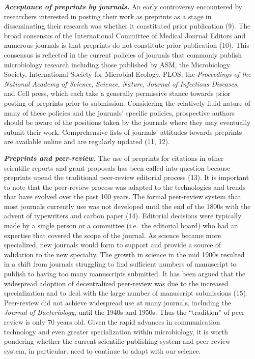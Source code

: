\documentclass[11pt,]{article}
\begin{document}
\textbf{\emph{Acceptance of preprints by journals.}} An early
controversy encountered by researchers interested in posting their work
as preprints as a stage in disseminating their research was whether it
constituted prior publication (9). The broad consensus of the
International Committee of Medical Journal Editors and numerous journals
is that preprints do not constitute prior publication (10). This
consensus is reflected in the current policies of journals that commonly
publish microbiology research including those published by ASM, the
Microbiology Society, International Society for Microbial Ecology, PLOS,
the \emph{Proceedings of the National Academy of Science},
\emph{Science}, \emph{Nature}, \emph{Journal of Infectious Diseases},
and Cell press, which each take a generally permissive stance towards
prior posting of preprints prior to submission. Considering the
relatively fluid nature of many of these policies and the journals'
specific policies, prospective authors should be aware of the positions
taken by the journals where they may eventually submit their work.
Comprehensive lists of journals' attitudes towards preprints are
available online and are regularly updated (11, 12).

\textbf{\emph{Preprints and peer-review.}} The use of preprints for
citations in other scientific reports and grant proposals has been
called into question because preprints upend the traditional peer-review
editorial process (13). It is important to note that the peer-review
process was adapted to the technologies and trends that have evolved
over the past 100 years. The formal peer-review system that most
journals currently use was not developed until the end of the 1800s with
the advent of typewriters and carbon paper (14). Editorial decisions
were typically made by a single person or a committee (i.e.~the
editorial board) who had an expertise that covered the scope of the
journal. As science became more specialized, new journals would form to
support and provide a source of validation to the new specialty. The
growth in science in the mid 1900s resulted in a shift from journals
struggling to find sufficient numbers of manuscript to publish to having
too many manuscripts submitted. It has been argued that the widespread
adoption of decentralized peer-review was due to the increased
specialization and to deal with the large number of manuscript
submissions (15). Peer-review did not achieve widespread use at many
journals, including the \emph{Journal of Bacteriology}, until the 1940s
and 1950s. Thus the ``tradition'' of peer-review is only 70 years old.
Given the rapid advances in communication technology and even greater
specialization within microbiology, it is worth pondering whether the
current scientific publishing system and peer-review system, in
particular, need to continue to adapt with our science.
\end{document}
